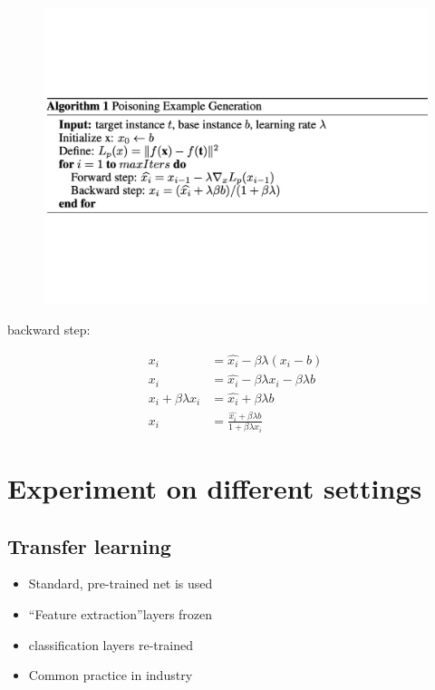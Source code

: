 \documentclass[11pt]{article}
\numberwithin{equation}{section}
\begin{document}
\begin{figure}[!h]
	\centering
	\includegraphics[width=17cm]{figures/alg1.pdf}
	\label{fig:alg1}
\end{figure}

\colorbox{orange!15}{backward step:}

\begin{align*}
    x_i &= \hat{x_i} - \beta \lambda (x_i - b)\\
    x_i &= \hat{x_i} - \beta \lambda x_i - \beta \lambda b\\
    x_i + \beta \lambda x_i &= \hat{x_i} + \beta \lambda b\\
    x_i &= \frac{\hat{x_i} + \beta \lambda b}{1 + \beta \lambda x_i}
\end{align*}

\section{Experiment on different settings}

\subsection{Transfer learning}

\begin{itemize}
    \item Standard, pre-trained net is used
    \item “Feature extraction”layers frozen
    \item classification layers re-trained
    \item Common practice in industry
\end{itemize}
\end{document}
